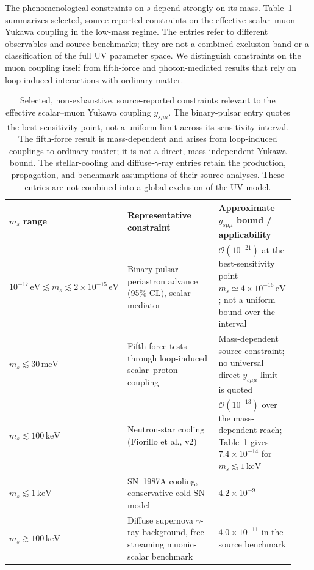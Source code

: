 \documentclass[onecolumn, aps, nofootinbib, prd, preprint, floats, floatfix, amsmath, amssymb, superscriptaddress, preprintnumbers]{revtex4-2}
\begin{document}
The phenomenological constraints on $s$ depend strongly on its mass. Table~\ref{tab:scalar_constraints} summarizes selected, source-reported constraints on the effective scalar--muon Yukawa coupling in the low-mass regime. The entries refer to different observables and source benchmarks; they are not a combined exclusion band or a classification of the full UV parameter space. We distinguish constraints on the muon coupling itself from fifth-force and photon-mediated results that rely on loop-induced interactions with ordinary matter.

\begin{table}[htbp]
\centering
\small
\begin{tabular}{p{0.27\linewidth}p{0.39\linewidth}p{0.27\linewidth}}
\hline
$m_s$ range & Representative constraint & Approximate $y_{s\mu\mu}$ bound / applicability \\
\hline
$10^{-17}\,\mathrm{eV}\lesssim m_s\lesssim2\times10^{-15}\,\mathrm{eV}$
& Binary-pulsar periastron advance (95\% CL), scalar mediator~\cite{Liu:2025zuz}
& $\mathcal{O}(10^{-21})$ at the best-sensitivity point $m_s\simeq4\times10^{-16}\,\mathrm{eV}$; not a uniform bound over the interval
\\[3pt]
$m_s\lesssim30\,\mathrm{meV}$
& Fifth-force tests through loop-induced scalar--proton coupling~\cite{Fiorillo:2026wso,Hoskins:1985tn,Kapner:2006si,Blakemore:2021zna}
& Mass-dependent source constraint; no universal direct $y_{s\mu\mu}$ limit is quoted
\\[3pt]
$m_s\lesssim100\,\mathrm{keV}$
& Neutron-star cooling (Fiorillo et al., v2)~\cite{Fiorillo:2026wso}
& $\mathcal{O}(10^{-13})$ over the mass-dependent reach; Table~1 gives $7.4\times10^{-14}$ for $m_s\lesssim1\,\mathrm{keV}$
\\[3pt]
$m_s\lesssim1\,\mathrm{keV}$
& SN~1987A cooling, conservative cold-SN model~\cite{Fiorillo:2026wso}
& $4.2\times10^{-9}$
\\[3pt]
$m_s\gtrsim100\,\mathrm{keV}$
& Diffuse supernova $\gamma$-ray background, free-streaming muonic-scalar benchmark~\cite{Caputo:2021rux}
& $4.0\times10^{-11}$ in the source benchmark
\\
\hline
\end{tabular}
\caption{Selected, non-exhaustive, source-reported constraints relevant to the effective scalar--muon Yukawa coupling $y_{s\mu\mu}$. The binary-pulsar entry quotes the best-sensitivity point, not a uniform limit across its sensitivity interval. The fifth-force result is mass-dependent and arises from loop-induced couplings to ordinary matter; it is not a direct, mass-independent Yukawa bound. The stellar-cooling and diffuse-$\gamma$-ray entries retain the production, propagation, and benchmark assumptions of their source analyses. These entries are not combined into a global exclusion of the UV model.}
\label{tab:scalar_constraints}
\end{table}
\end{document}
